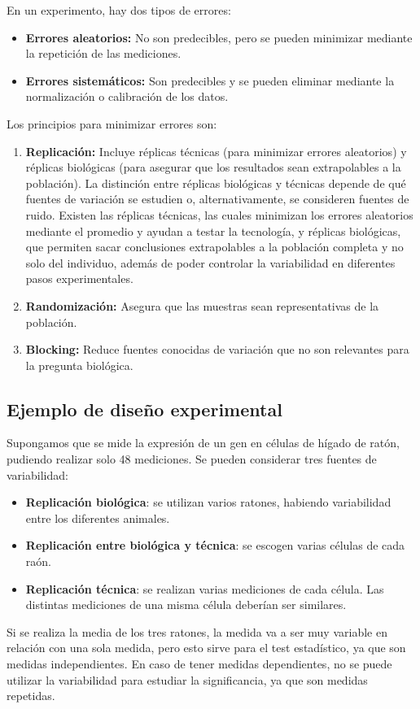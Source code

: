 En un experimento, hay dos tipos de errores:
\begin{itemize}
\item \textbf{Errores aleatorios:} No son predecibles, pero se pueden minimizar mediante la repetición de las mediciones.
\item \textbf{Errores sistemáticos:} Son predecibles y se pueden eliminar mediante la normalización o calibración de los datos.
\end{itemize}

Los principios para minimizar errores son:
\begin{enumerate}
\item \textbf{Replicación:} Incluye réplicas técnicas (para minimizar errores aleatorios) y réplicas biológicas (para asegurar que los resultados sean extrapolables a la población). La distinción entre réplicas biológicas y técnicas depende de qué fuentes de variación se estudien o, alternativamente, se consideren fuentes de ruido. Existen las réplicas técnicas, las cuales minimizan los errores aleatorios mediante el promedio y ayudan a testar la tecnología, y réplicas biológicas, que permiten sacar conclusiones extrapolables a la población completa y no solo del individuo, además de poder controlar la variabilidad en diferentes pasos experimentales.
\item \textbf{Randomización:} Asegura que las muestras sean representativas de la población.
\item \textbf{Blocking:} Reduce fuentes conocidas de variación que no son relevantes para la pregunta biológica.
\end{enumerate}

\subsection{Ejemplo de diseño experimental}
Supongamos que se mide la expresión de un gen en células de hígado de ratón, pudiendo realizar solo 48 mediciones. Se pueden considerar tres fuentes de variabilidad:
\begin{itemize}
\item \textbf{Replicación biológica}: se utilizan varios ratones, habiendo variabilidad entre los diferentes animales.
\item \textbf{Replicación entre biológica y técnica}: se escogen varias células de cada raón.
\item \textbf{Replicación técnica}: se realizan varias mediciones de cada célula. Las distintas mediciones de una misma célula deberían ser similares.
\end{itemize}
Si se realiza la media de los tres ratones, la medida va a ser muy variable en relación con una sola medida, pero esto sirve para el test estadístico, ya que son medidas independientes. En caso de tener medidas dependientes, no se puede utilizar la variabilidad para estudiar la significancia, ya que son medidas repetidas. 

